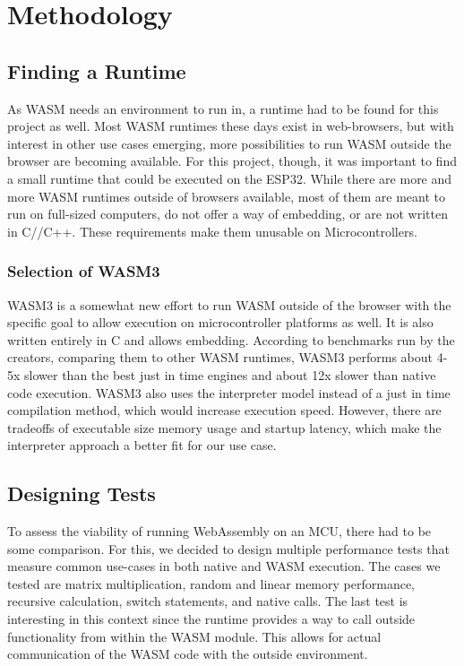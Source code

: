 
\chapter{Methodology}\label{chapter:methodology}
\section{Finding a Runtime}
As WASM needs an environment to run in, a runtime had to be found for this project as well. Most WASM runtimes these days exist in web-browsers, but with interest in other use cases emerging, more possibilities to run WASM outside the browser are becoming available. For this project, though, it was important to find a small runtime that could be executed on the ESP32.
While there are more and more WASM runtimes outside of browsers available, most of them are meant to run on full-sized computers, do not offer a way of embedding, or are not written in C//C++. These requirements make them unusable on Microcontrollers.
\subsection{Selection of WASM3}
WASM3 is a somewhat new effort to run WASM outside of the browser with the specific goal to allow execution on microcontroller platforms as well. It is also written entirely in C and allows embedding. According to benchmarks run by the creators, comparing them to other WASM runtimes, WASM3 performs about 4-5x slower than the best just in time engines and about 12x slower than native code execution.
WASM3 also uses the interpreter model instead of a just in time compilation method, which would increase execution speed. However, there are tradeoffs of executable size memory usage and startup latency, which make the interpreter approach a better fit for our use case.
\section{Designing Tests}
To assess the viability of running WebAssembly on an MCU, there had to be some comparison. For this, we decided to design multiple performance tests that measure common use-cases in both native and WASM execution.
The cases we tested are matrix multiplication, random and linear memory performance, recursive calculation, switch statements, and native calls. The last test is interesting in this context since the runtime provides a way to call outside functionality from within the WASM module. This allows for actual communication of the WASM code with the outside environment.
